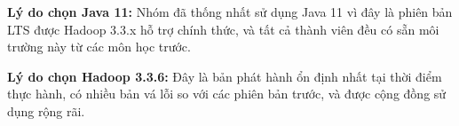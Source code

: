 \textbf{Lý do chọn Java 11:} Nhóm đã thống nhất sử dụng Java 11 vì đây là phiên bản LTS được Hadoop 3.3.x hỗ trợ chính thức, và tất cả thành viên đều có sẵn môi trường này từ các môn học trước.

\textbf{Lý do chọn Hadoop 3.3.6:} Đây là bản phát hành ổn định nhất tại thời điểm thực hành, có nhiều bản vá lỗi so với các phiên bản trước, và được cộng đồng sử dụng rộng rãi.
